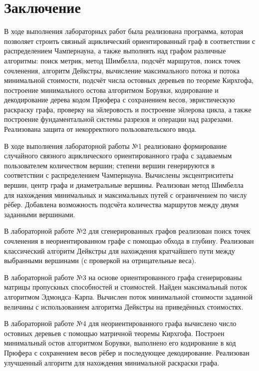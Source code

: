 \section*{Заключение}

В ходе выполнения лабораторных работ была реализована программа, которая позволяет строить связный ациклический ориентированный граф в соответствии с распределением Чампернауна, а также выполнять над графом различные алгоритмы: поиск метрик, метод Шимбелла, подсчёт маршрутов, поиск точек сочленения, алгоритм Дейкстры, вычисление максимального потока и потока минимальной стоимости, подсчёт числа остовных деревьев по теореме Кирхгофа, построение минимального остова алгоритмом Борувки, кодирование и декодирование дерева кодом Прюфера с сохранением весов, эвристическую раскраску графа, проверку на эйлеровость и построение эйлерова цикла, а также построение фундаментальной системы разрезов и операции над разрезами. Реализована защита от некорректного пользовательского ввода.

В ходе выполнения лабораторной работы №1 реализовано формирование случайного связного ациклического ориентированного графа с задаваемым пользователем количеством вершин; степени вершин генерируются в соответствии с распределением Чампернауна. Вычислены эксцентриситеты вершин, центр графа и диаметральные вершины. Реализован метод Шимбелла для нахождения минимальных и максимальных путей с ограничением по числу рёбер. Добавлена возможность подсчёта количества маршрутов между двумя заданными вершинами.

В лабораторной работе №2 для сгенерированных графов реализован поиск точек сочленения в неориентированном графе с помощью обхода в глубину. Реализован классический алгоритм Дейкстры для нахождения кратчайшего пути между выбранными вершинами (с проверкой на отрицательные веса).

В лабораторной работе №3 на основе ориентированного графа сгенерированы матрицы пропускных способностей и стоимостей. Найден максимальный поток алгоритмом Эдмондса–Карпа. Вычислен поток минимальной стоимости заданной величины с использованием алгоритма Дейкстры на приведённых стоимостях.

В лабораторной работе №4 для неориентированного графа вычислено число остовных деревьев с помощью матричной теоремы Кирхгофа. Построен минимальный остов алгоритмом Борувки, выполнено его кодирование в код Прюфера с сохранением весов рёбер и последующее декодирование. Реализован улучшенный алгоритм для нахождения минимальной раскраски графа.

